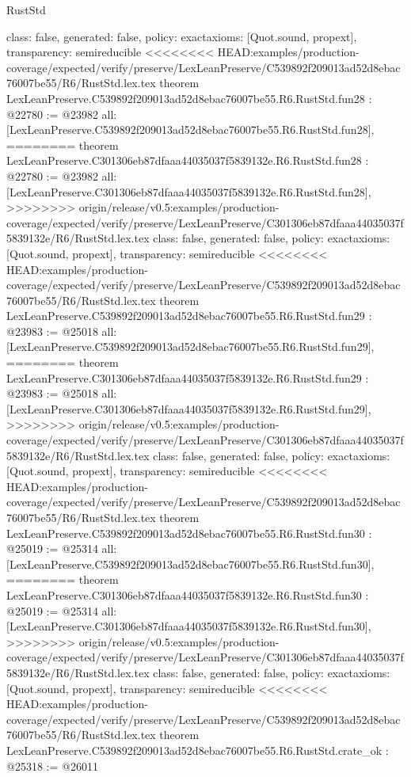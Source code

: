 \begin{lexlean}{RustStd}
\begin{coremodule}
{\begin{coremodule}
{{{{{{{{{{{{{{{{{{{{{{{{{{{{{{{  class: false,
  generated: false,
  policy: exact{axioms: [Quot.sound, propext]},
  transparency: semireducible
}
<<<<<<<< HEAD:examples/production-coverage/expected/verify/preserve/LexLeanPreserve/C539892f209013ad52d8ebac76007be55/R6/RustStd.lex.tex
theorem LexLeanPreserve.C539892f209013ad52d8ebac76007be55.R6.RustStd.fun28 : @22780 := @23982 {
  all: [LexLeanPreserve.C539892f209013ad52d8ebac76007be55.R6.RustStd.fun28],
========
theorem LexLeanPreserve.C301306eb87dfaaa44035037f5839132e.R6.RustStd.fun28 : @22780 := @23982 {
  all: [LexLeanPreserve.C301306eb87dfaaa44035037f5839132e.R6.RustStd.fun28],
>>>>>>>> origin/release/v0.5:examples/production-coverage/expected/verify/preserve/LexLeanPreserve/C301306eb87dfaaa44035037f5839132e/R6/RustStd.lex.tex
  class: false,
  generated: false,
  policy: exact{axioms: [Quot.sound, propext]},
  transparency: semireducible
}
<<<<<<<< HEAD:examples/production-coverage/expected/verify/preserve/LexLeanPreserve/C539892f209013ad52d8ebac76007be55/R6/RustStd.lex.tex
theorem LexLeanPreserve.C539892f209013ad52d8ebac76007be55.R6.RustStd.fun29 : @23983 := @25018 {
  all: [LexLeanPreserve.C539892f209013ad52d8ebac76007be55.R6.RustStd.fun29],
========
theorem LexLeanPreserve.C301306eb87dfaaa44035037f5839132e.R6.RustStd.fun29 : @23983 := @25018 {
  all: [LexLeanPreserve.C301306eb87dfaaa44035037f5839132e.R6.RustStd.fun29],
>>>>>>>> origin/release/v0.5:examples/production-coverage/expected/verify/preserve/LexLeanPreserve/C301306eb87dfaaa44035037f5839132e/R6/RustStd.lex.tex
  class: false,
  generated: false,
  policy: exact{axioms: [Quot.sound, propext]},
  transparency: semireducible
}
<<<<<<<< HEAD:examples/production-coverage/expected/verify/preserve/LexLeanPreserve/C539892f209013ad52d8ebac76007be55/R6/RustStd.lex.tex
theorem LexLeanPreserve.C539892f209013ad52d8ebac76007be55.R6.RustStd.fun30 : @25019 := @25314 {
  all: [LexLeanPreserve.C539892f209013ad52d8ebac76007be55.R6.RustStd.fun30],
========
theorem LexLeanPreserve.C301306eb87dfaaa44035037f5839132e.R6.RustStd.fun30 : @25019 := @25314 {
  all: [LexLeanPreserve.C301306eb87dfaaa44035037f5839132e.R6.RustStd.fun30],
>>>>>>>> origin/release/v0.5:examples/production-coverage/expected/verify/preserve/LexLeanPreserve/C301306eb87dfaaa44035037f5839132e/R6/RustStd.lex.tex
  class: false,
  generated: false,
  policy: exact{axioms: [Quot.sound, propext]},
  transparency: semireducible
}
<<<<<<<< HEAD:examples/production-coverage/expected/verify/preserve/LexLeanPreserve/C539892f209013ad52d8ebac76007be55/R6/RustStd.lex.tex
theorem LexLeanPreserve.C539892f209013ad52d8ebac76007be55.R6.RustStd.crate_ok : @25318 := @26011 {
}}}}}}}}}}}}}}}}}}}}}}}}}}}}}}}}}}
\end{coremodule}}
\end{coremodule}
\end{lexlean}
